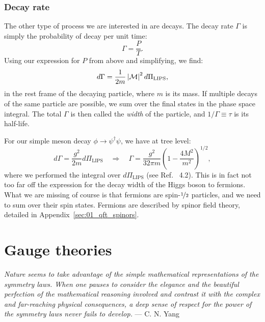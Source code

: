 \subsubsection{Decay rate}

The other type of process we are interested in are decays.
The decay rate $\Gamma$ is simply the probability of decay per unit time:
\begin{equation}
	\label{eq:01_qft_interactions_decay_rate}
	\Gamma =  \frac{P}{T}.
\end{equation}
Using our expression for $P$ from above and simplifying, we find:
\begin{equation}
	\label{eq:01_qft_interactions_differential_decay_rate}
	d\Gamma = \frac{1}{2m} \left\lvert \mathcal M \right\rvert^2 d\Pi_{\mathrm{LIPS}},
\end{equation}
in the rest frame of the decaying particle, where $m$ is its mass.
If multiple decays of the same particle are possible, we sum over the final states in the phase space integral.
The total $\Gamma$ is then called the \textit{width} of the particle, and $1/\Gamma \equiv \tau$ is its half-life.

For our simple meson decay $\phi \rightarrow \psi^\dagger\psi$, we have at tree level:
\begin{equation}
	\label{eq:01_qft_interactions_decay_rate_meson_decay}
	d\Gamma = \frac{g^2}{2m} d\Pi_{\mathrm{LIPS}} \quad \Rightarrow \quad \Gamma = \frac{g^2}{32\pi m} \left(1 - \frac{4M^2}{m^2}\right)^{1/2},
\end{equation}
where we performed the integral over $d\Pi_{\mathrm{LIPS}}$ (see Ref.~\cite{XianyuPSSolutions} 4.2).
This is in fact not too far off the expression for the decay width of the Higgs boson to fermions.
What we are missing of course is that fermions are spin-$\cnicefrac{1}{2}$ particles, and we need to sum over their spin states.
Fermions are described by spinor field theory, detailed in Appendix~\ref{sec:01_qft_spinors}.

\section{Gauge theories}
\label{sec:01_qft_gt}

{
	\noindent
	\textit{Nature seems to take advantage of the simple mathematical representations of the symmetry laws. 
	When one pauses to consider the elegance and the beautiful perfection of the mathematical reasoning involved and contrast it with the complex and far-reaching physical consequences, a deep sense of respect for the power of the symmetry laws never fails to develop.} --- C. N. Yang
}

